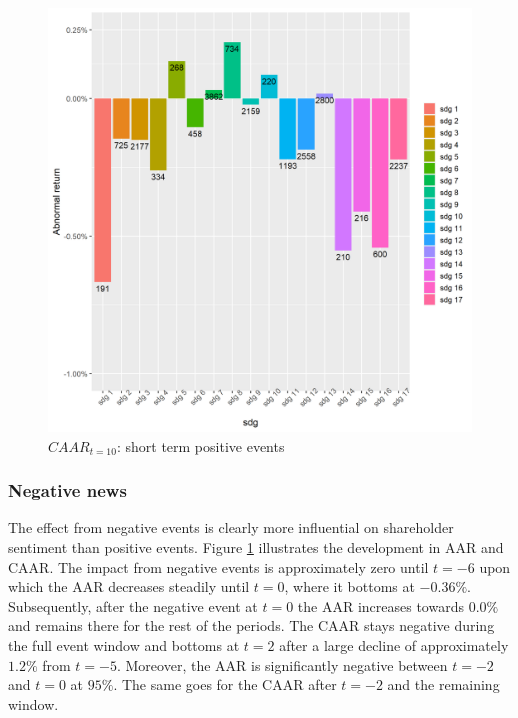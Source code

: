 \begin{figure} [H]
    \centering
    \includegraphics[scale=0.6]{Projekt/1.Figures analysis/ST_positive_sdg_bar.png}
    \caption{$CAAR_{t=10}$: short term positive events}
    \label{fig:ST_pos_news}
\end{figure}




 \label{ST_tab}

\subsubsection{Negative news}

The effect from negative events is clearly more influential on shareholder sentiment than positive events. Figure \ref{fig:ST_pos_news} illustrates the development in AAR and CAAR.  The impact from negative events is approximately zero until $t = -6$ upon which the AAR decreases steadily until $t=0$, where it bottoms at $-0.36\%$. Subsequently, after the negative event at $t=0$ the AAR increases towards $0.0\%$ and remains there for the rest of the periods. The CAAR stays negative during the full event window and bottoms at $t=2$ after a large decline of approximately $1.2\%$ from  $t=-5$.  
Moreover, the AAR is significantly negative between $t=-2$ and $t=0$ at $95\%$. The same goes for the CAAR after $t=-2$ and the remaining window.  

